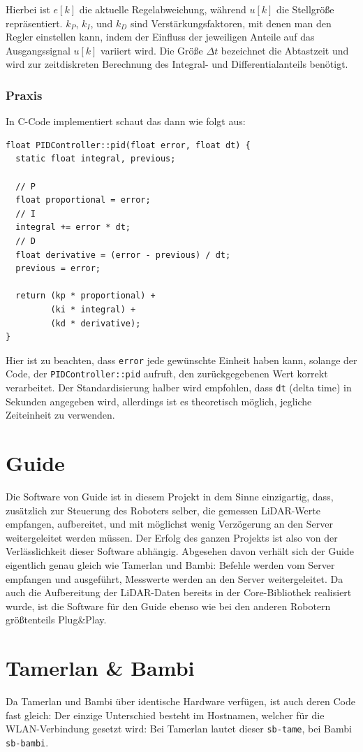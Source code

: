 Hierbei ist $e[k]$ die aktuelle Regelabweichung,
während $u[k]$ die Stellgröße repräsentiert.
%
$k_P$, $k_I$, und $k_D$ sind Verstärkungsfaktoren,
mit denen man den Regler einstellen kann,
indem der Einfluss der jeweiligen Anteile
auf das Ausgangssignal $u[k]$ variiert wird.
%
Die Größe $\Delta t$ bezeichnet die Abtastzeit und wird zur zeitdiskreten
Berechnung des Integral- und Differentialanteils benötigt.

\subsubsection{Praxis}
In C-Code implementiert schaut das dann wie folgt aus:
\begin{lstlisting}[caption={Implementierung des PID-Reglers in C}]
float PIDController::pid(float error, float dt) {
  static float integral, previous;

  // P
  float proportional = error;
  // I
  integral += error * dt;
  // D
  float derivative = (error - previous) / dt;
  previous = error;

  return (kp * proportional) +
         (ki * integral) +
         (kd * derivative);
}
\end{lstlisting}
Hier ist zu beachten,
dass \texttt{error}
jede gewünschte Einheit haben kann,
solange der Code,
der \texttt{PIDController::pid} aufruft,
den zurückgegebenen Wert korrekt verarbeitet.
%
Der Standardisierung halber wird empfohlen,
dass \texttt{dt} (delta time) in Sekunden angegeben wird,
allerdings ist es theoretisch möglich,
jegliche Zeiteinheit zu verwenden. 

\section{Guide}
\label{subsec:software_guide}
Die Software von Guide ist in diesem Projekt in dem Sinne einzigartig,
dass,
zusätzlich zur Steuerung des Roboters selber,
die gemessen LiDAR-Werte empfangen,
aufbereitet,
und mit möglichst wenig Verzögerung an den Server weitergeleitet werden müssen.
%
Der Erfolg des ganzen Projekts ist also von der Verlässlichkeit dieser Software abhängig.
%
Abgesehen davon verhält sich der Guide eigentlich genau gleich wie Tamerlan und Bambi:
%
Befehle werden vom Server empfangen und ausgeführt,
Messwerte werden an den Server weitergeleitet.
%
Da auch die Aufbereitung der LiDAR-Daten bereits in der Core-Bibliothek realisiert wurde,
ist die Software für den Guide ebenso wie bei den anderen Robotern größtenteils Plug\&Play.

\section{Tamerlan \& Bambi}
\label{subsec:software_tamerlan}
Da Tamerlan und Bambi über identische Hardware verfügen,
ist auch deren Code fast gleich:
%
Der einzige Unterschied besteht im Hostnamen, welcher für die WLAN-Verbindung gesetzt wird:
%
Bei Tamerlan lautet dieser \texttt{sb-tame}, bei Bambi \texttt{sb-bambi}.